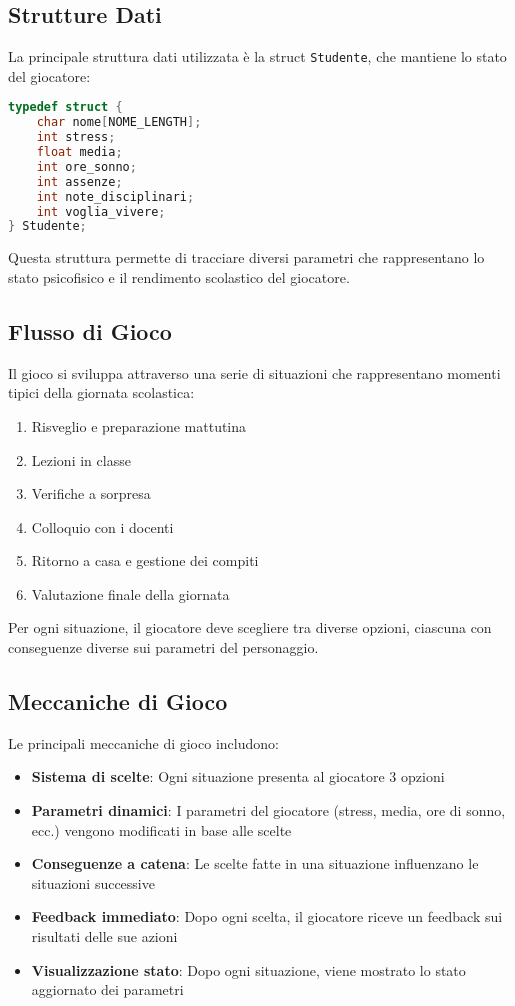 \documentclass[a4paper,12pt]{article}
\begin{document}
\subsection{Strutture Dati}

La principale struttura dati utilizzata è la struct \texttt{Studente}, che mantiene lo stato del giocatore:

\begin{lstlisting}[language=C, caption=Struttura dati Studente]
typedef struct {
    char nome[NOME_LENGTH];
    int stress;
    float media;
    int ore_sonno;
    int assenze;
    int note_disciplinari;
    int voglia_vivere;
} Studente;
\end{lstlisting}

Questa struttura permette di tracciare diversi parametri che rappresentano lo stato psicofisico e il rendimento scolastico del giocatore.

\subsection{Flusso di Gioco}

Il gioco si sviluppa attraverso una serie di situazioni che rappresentano momenti tipici della giornata scolastica:

\begin{enumerate}
    \item Risveglio e preparazione mattutina
    \item Lezioni in classe
    \item Verifiche a sorpresa
    \item Colloquio con i docenti
    \item Ritorno a casa e gestione dei compiti
    \item Valutazione finale della giornata
\end{enumerate}

Per ogni situazione, il giocatore deve scegliere tra diverse opzioni, ciascuna con conseguenze diverse sui parametri del personaggio.

\subsection{Meccaniche di Gioco}

Le principali meccaniche di gioco includono:

\begin{itemize}
    \item \textbf{Sistema di scelte}: Ogni situazione presenta al giocatore 3 opzioni
    \item \textbf{Parametri dinamici}: I parametri del giocatore (stress, media, ore di sonno, ecc.) vengono modificati in base alle scelte
    \item \textbf{Conseguenze a catena}: Le scelte fatte in una situazione influenzano le situazioni successive
    \item \textbf{Feedback immediato}: Dopo ogni scelta, il giocatore riceve un feedback sui risultati delle sue azioni
    \item \textbf{Visualizzazione stato}: Dopo ogni situazione, viene mostrato lo stato aggiornato dei parametri
\end{itemize}
\end{document}
